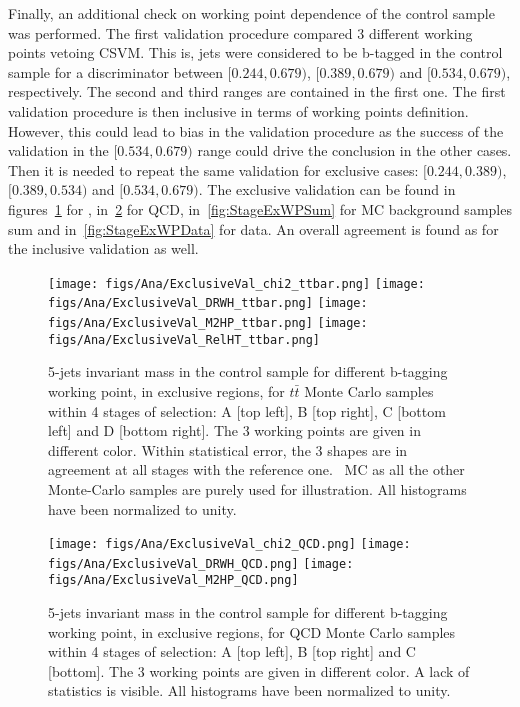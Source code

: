 Finally, an additional check on working point dependence of the control sample was performed. The first validation procedure compared 3 different working points vetoing CSVM. This is, jets were considered to be b-tagged in the control sample for a discriminator between $[0.244,0.679)$, $[0.389,0.679)$ and $[0.534,0.679)$, respectively. The second and third ranges are contained in the first one. The first validation procedure is then inclusive in terms of working points definition. However, this could lead to bias in the validation procedure as the success of the validation in the $[0.534,0.679)$ range could drive the conclusion in the other cases. Then it is needed to repeat the same validation for exclusive cases: $[0.244,0.389)$, $[0.389,0.534)$ and $[0.534,0.679)$. The exclusive validation can be found in figures~\ref{fig:StageExWPttbar} for \ttbar, in~\ref{fig:StageExWPQCD} for QCD, in~\ref{fig:StageExWPSum} for MC background samples sum and in~\ref{fig:StageExWPData} for data. An overall agreement is found as for the inclusive validation as well.

\begin{figure}[!Hhtbp]
  \begin{center}
    \texttt{[image: figs/Ana/ExclusiveVal\_chi2\_ttbar.png]}
    \texttt{[image: figs/Ana/ExclusiveVal\_DRWH\_ttbar.png]}
    \texttt{[image: figs/Ana/ExclusiveVal\_M2HP\_ttbar.png]}
    \texttt{[image: figs/Ana/ExclusiveVal\_RelHT\_ttbar.png]}
    \caption{5-jets invariant mass in the control sample for different b-tagging working point, in exclusive regions, for $t\bar{t}$ Monte Carlo samples within 4 stages of selection: A [top left], B [top right], C [bottom left] and D [bottom right]. The 3 working points are given in different color. Within statistical error, the 3 shapes are in agreement at all stages with the reference one. \ttbar~MC as all the other Monte-Carlo samples are purely used for illustration. All histograms have been normalized to unity.}
    \label{fig:StageExWPttbar}
  \end{center}
\end{figure}

\begin{figure}[!Hhtbp]
  \begin{center}
    \texttt{[image: figs/Ana/ExclusiveVal\_chi2\_QCD.png]}
    \texttt{[image: figs/Ana/ExclusiveVal\_DRWH\_QCD.png]}
    \texttt{[image: figs/Ana/ExclusiveVal\_M2HP\_QCD.png]}
    \caption{5-jets invariant mass in the control sample for different b-tagging working point, in exclusive regions, for QCD Monte Carlo samples within 4 stages of selection: A [top left], B [top right] and C [bottom]. The 3 working points are given in different color. A lack of statistics is visible. All histograms have been normalized to unity.}
    \label{fig:StageExWPQCD}
  \end{center}
\end{figure}

